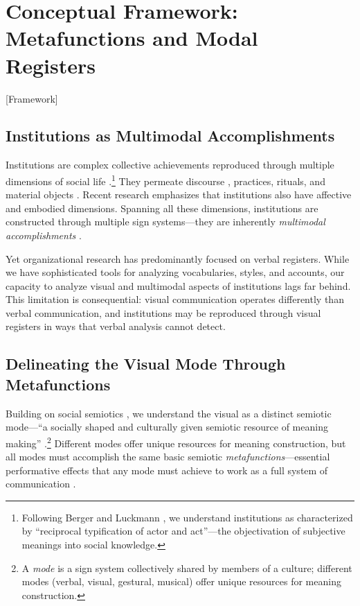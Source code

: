 \documentclass[../main.tex]{subfiles}
\begin{document}
\section{Conceptual Framework: Metafunctions and Modal Registers}[Framework]

\subsection{Institutions as Multimodal Accomplishments}

Institutions are complex collective achievements reproduced through multiple dimensions of social life \cite{scott2007organizations}.\footnote{Following Berger and Luckmann \cite{berger1967social}, we understand institutions as characterized by ``reciprocal typification of actor and act''---the objectivation of subjective meanings into social knowledge.} They permeate discourse \cite{phillips2004discourse}, practices, rituals, and material objects \cite{thornton2012institutional}. Recent research emphasizes that institutions also have affective and embodied dimensions. Spanning all these dimensions, institutions are constructed through multiple sign systems---they are inherently \textit{multimodal accomplishments} \cite{jancsary2018institutions}.

Yet organizational research has predominantly focused on verbal registers. While we have sophisticated tools for analyzing vocabularies, styles, and accounts, our capacity to analyze visual and multimodal aspects of institutions lags far behind. This limitation is consequential: visual communication operates differently than verbal communication, and institutions may be reproduced through visual registers in ways that verbal analysis cannot detect.

\subsection{Delineating the Visual Mode Through Metafunctions}

Building on social semiotics \cite{kress2006reading,kress2009multimodality,vanleeuwen2005introducing}, we understand the visual as a distinct semiotic mode---``a socially shaped and culturally given semiotic resource of meaning making'' \cite{kress2009multimodality}.\footnote{A \textit{mode} is a sign system collectively shared by members of a culture; different modes (verbal, visual, gestural, musical) offer unique resources for meaning construction.} Different modes offer unique resources for meaning construction, but all modes must accomplish the same basic semiotic \textit{metafunctions}---essential performative effects that any mode must achieve to work as a full system of communication \cite{halliday1978language}.
\end{document}
